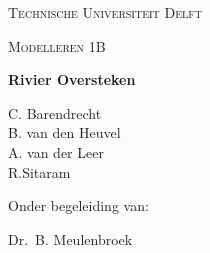 


\begin{comment}
\renewcommand{\ThisLRCornerWallPaper}[2]{%
  \AddToShipoutPicture*{%
    \AtPageLowerLeft{%
      \parbox[b]{\paperwidth}{%
        \hfill \texttt{[image: \#2]}%
	\hspace{1cm}\vspace{0.5cm}
      }
    }
  }
}

\renewcommand{\ThisLLCornerWallPaper}[2]{%
\AddToShipoutPicture*{%
  \AtPageLowerLeft{%
  	\parbox[b]{\paperwidth}{%
		\hspace{0.8cm}    
   	 	\texttt{[image: \#2]}%
		\vspace{0.5cm}    
	}
   }
  }
}
\end{comment}

\begin{titlepage}


	\centering
	{\scshape\Large Technische Universiteit Delft\par}
	\vspace{1cm}
	{\scshape\Large Modelleren 1B\par}
	\vspace{1.5cm}
	{\Huge\bfseries Rivier Oversteken\par}
	\vspace{2cm}
	{\Large
	C. Barendrecht\\ 
	B. van den Heuvel\\
	A. van der Leer\\
	R.Sitaram\par}
	\vfill
	Onder begeleiding van:\par
	Dr.~B. Meulenbroek

	\vfill
\end{titlepage}
\ClearWallPaper